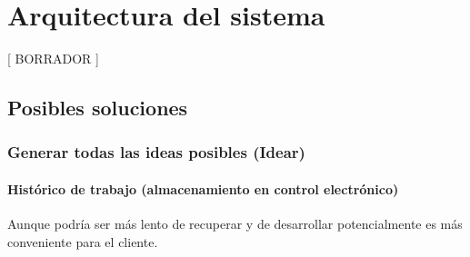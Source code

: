 \chapter{Arquitectura del sistema}

[ BORRADOR ]

\section{Posibles soluciones}

\subsection{Generar todas las ideas posibles (Idear)}

\subsubsection{Histórico de trabajo (almacenamiento en control electrónico)}

Aunque podría ser más lento de recuperar y de desarrollar potencialmente
es más conveniente para el cliente.

